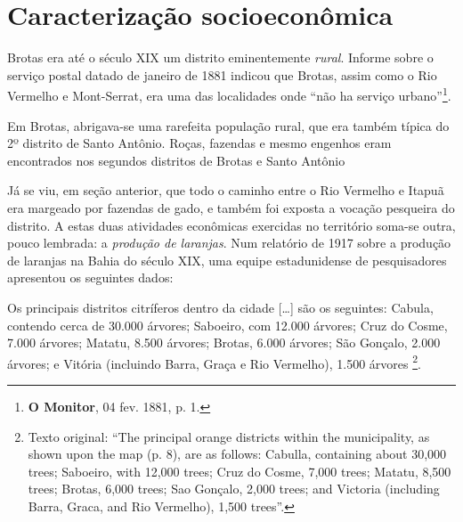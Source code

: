 \section{Caracterização socioeconômica}\label{sec:2.2}

Brotas era até o século XIX um distrito eminentemente \textit{rural}. Informe sobre o serviço postal datado de janeiro de 1881 indicou que Brotas, assim como o Rio Vermelho e Mont-Serrat, era uma das localidades onde ``não ha serviço urbano''\footnote{\textbf{O Monitor}, 04 fev. 1881, p. 1.}.

\begin{citacao}
Em Brotas, abrigava-se uma rarefeita população rural, que era também típica do 2º distrito de Santo Antônio. Roças, fazendas e mesmo engenhos eram encontrados nos segundos distritos de Brotas e Santo Antônio \cite[p.~52]{NASCIMENTO2007}
\end{citacao}

Já se viu, em seção anterior, que todo o caminho entre o Rio Vermelho e Itapuã era margeado por fazendas de gado, e também foi exposta a vocação pesqueira do distrito. A estas duas atividades econômicas exercidas no território soma-se outra, pouco lembrada: a \textit{produção de laranjas}. Num relatório de 1917 sobre a produção de laranjas na Bahia do século XIX, uma equipe estadunidense de pesquisadores apresentou os seguintes dados:

\begin{citacao}
Os principais distritos citríferos dentro da cidade [\dots] são os seguintes: Cabula, contendo cerca de 30.000 árvores; Saboeiro, com 12.000 árvores; Cruz do Cosme, 7.000 árvores; Matatu, 8.500 árvores; Brotas, 6.000 árvores; São Gonçalo, 2.000 árvores; e Vitória (incluindo Barra, Graça e Rio Vermelho), 1.500 árvores \cite[p.~3]{dorsett_orange_1917}\footnote{Texto original: ``The principal orange districts within the municipality, as shown upon the map (p. 8), are as follows: Cabulla, containing about 30,000 trees; Saboeiro, with 12,000 trees; Cruz do Cosme, 7,000 trees; Matatu, 8,500 trees; Brotas, 6,000 trees; Sao Gonçalo, 2,000 trees; and Victoria (including Barra, Graca, and Rio Vermelho), 1,500 trees''.}.
\end{citacao}

